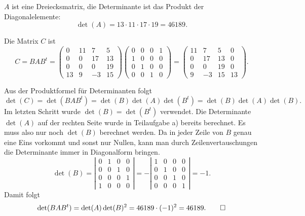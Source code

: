 \begin{loesung}
\begin{teilaufgaben}
\item $A$ ist eine Dreiecksmatrix, die Determinante ist das Produkt der
Diagonalelemente:
\[
\det(A) = 13\cdot 11 \cdot 17\cdot 19=46189.
\]
\item Die Matrix $C$ ist
\[
C
=
BAB^t
=
\begin{pmatrix}
    0&  11&   7&   5\\
    0&   0&  17&  13\\
    0&   0&   0&  19\\
   13&   9&  -3&  15
\end{pmatrix}
\begin{pmatrix}
0&0&0&1\\
1&0&0&0\\
0&1&0&0\\
0&0&1&0
\end{pmatrix}
=
\begin{pmatrix}
  11&   7&   5&   0\\
   0&  17&  13&   0\\
   0&   0&  19&   0\\
   9&  -3&  15&  13
\end{pmatrix}.
\]
\item Aus der Produktformel für Determinanten folgt
\[
\det(C)
=
\det(BAB^t)
=
\det(B)\det(A)\det(B^t)=\det(B)\det(A)\det(B).
\]
Im letzten Schritt wurde $\det(B)=\det(B^t)$ verwendet.
Die Determinante $\det(A)$ auf der rechten Seite wurde in Teilaufgabe a)
bereits berechnet.
Es muss also nur noch $\det(B)$ berechnet werden.
Da in jeder Zeile von $B$ genau eine Eins vorkommt und sonst nur Nullen,
kann man durch Zeilenvertauschungen die Determinante immer in Diagonalform
bringen.
\[
\det(B)
=
\left|
\begin{matrix}
   0&  1&  0&  0\\
   0&  0&  1&  0\\
   0&  0&  0&  1\\
   1&  0&  0&  0
\end{matrix}\right|
=
-
\left|\begin{matrix}
1&0&0&0\\
0&1&0&0\\
0&0&1&0\\
0&0&0&1
\end{matrix}\right|
=-1.
\]
Damit folgt
\[
\det(BAB^t)
=
\det(A)\det(B)^2
=
46189\cdot(-1)^2=46189.\qedhere
\]
\end{teilaufgaben}
\end{loesung}

